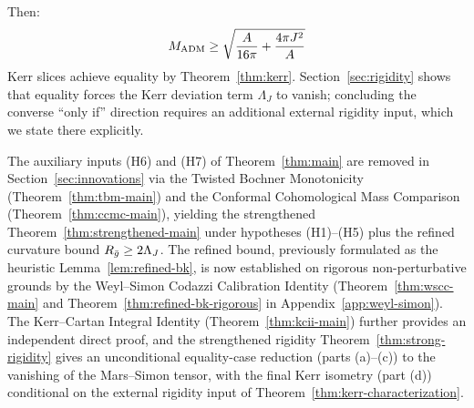 \begin{theorem}
Then:
\begin{equation}\label{eq:main}
    M_{\mathrm{ADM}} \geq \sqrt{\frac{A}{16\pi} + \frac{4\pi J^2}{A}}
\end{equation}
Kerr slices achieve equality by Theorem~\ref{thm:kerr}. Section~\ref{sec:rigidity} shows that equality forces the Kerr deviation term $\Lambda_J$ to vanish; concluding the converse ``only if'' direction requires an additional external rigidity input, which we state there explicitly.
\end{theorem}

\begin{remark}\label{rem:strengthened-thm}
The auxiliary inputs (H6) and (H7) of Theorem~\ref{thm:main} are removed in Section~\ref{sec:innovations} via the Twisted Bochner Monotonicity (Theorem~\ref{thm:tbm-main}) and the Conformal Cohomological Mass Comparison (Theorem~\ref{thm:ccmc-main}), yielding the strengthened Theorem~\ref{thm:strengthened-main} under hypotheses (H1)--(H5) plus the refined curvature bound $R_{\bar{g}} \geq 2\Lambda_J$. The refined bound, previously formulated as the heuristic Lemma~\ref{lem:refined-bk}, is now established on rigorous non-perturbative grounds by the Weyl--Simon Codazzi Calibration Identity (Theorem~\ref{thm:wscc-main} and Theorem~\ref{thm:refined-bk-rigorous} in Appendix~\ref{app:weyl-simon}). The Kerr--Cartan Integral Identity (Theorem~\ref{thm:kcii-main}) further provides an independent direct proof, and the strengthened rigidity Theorem~\ref{thm:strong-rigidity} gives an unconditional equality-case reduction (parts (a)--(c)) to the vanishing of the Mars--Simon tensor, with the final Kerr isometry (part (d)) conditional on the external rigidity input of Theorem~\ref{thm:kerr-characterization}.
\end{remark}

